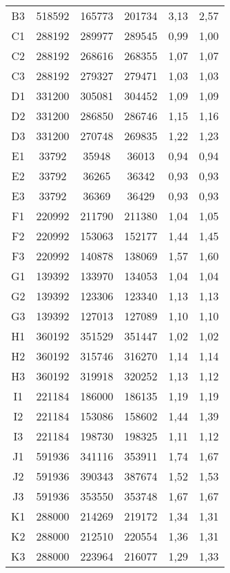 \begin{center}
\begin{longtable}{cccccc}
    B3    & 518592 & 165773 & 201734 & 3,13  & 2,57 \\
    C1    & 288192 & 289977 & 289545 & 0,99  & 1,00 \\
    C2    & 288192 & 268616 & 268355 & 1,07  & 1,07 \\
    C3    & 288192 & 279327 & 279471 & 1,03  & 1,03 \\
    D1    & 331200 & 305081 & 304452 & 1,09  & 1,09 \\
    D2    & 331200 & 286850 & 286746 & 1,15  & 1,16 \\
    D3    & 331200 & 270748 & 269835 & 1,22  & 1,23 \\
    E1    & 33792 & 35948 & 36013 & 0,94  & 0,94 \\
    E2    & 33792 & 36265 & 36342 & 0,93  & 0,93 \\
    E3    & 33792 & 36369 & 36429 & 0,93  & 0,93 \\
    F1    & 220992 & 211790 & 211380 & 1,04  & 1,05 \\
    F2    & 220992 & 153063 & 152177 & 1,44  & 1,45 \\
    F3    & 220992 & 140878 & 138069 & 1,57  & 1,60 \\
    G1    & 139392 & 133970 & 134053 & 1,04  & 1,04 \\
    G2    & 139392 & 123306 & 123340 & 1,13  & 1,13 \\
    G3    & 139392 & 127013 & 127089 & 1,10  & 1,10 \\
    H1    & 360192 & 351529 & 351447 & 1,02  & 1,02 \\
    H2    & 360192 & 315746 & 316270 & 1,14  & 1,14 \\
    H3    & 360192 & 319918 & 320252 & 1,13  & 1,12 \\
    I1    & 221184 & 186000 & 186135 & 1,19  & 1,19 \\
    I2    & 221184 & 153086 & 158602 & 1,44  & 1,39 \\
    I3    & 221184 & 198730 & 198325 & 1,11  & 1,12 \\
    J1    & 591936 & 341116 & 353911 & 1,74  & 1,67 \\
    J2    & 591936 & 390343 & 387674 & 1,52  & 1,53 \\
    J3    & 591936 & 353550 & 353748 & 1,67  & 1,67 \\
    K1    & 288000 & 214269 & 219172 & 1,34  & 1,31 \\
    K2    & 288000 & 212510 & 220554 & 1,36  & 1,31 \\
    K3    & 288000 & 223964 & 216077 & 1,29  & 1,33 \\

\end{longtable}
\end{center}
